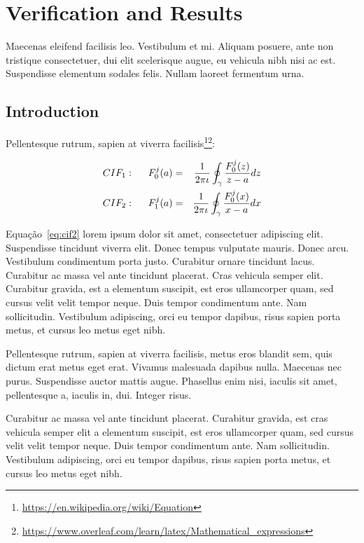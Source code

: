 \chapter{Verification and Results} \label{chap:ch3}

Maecenas eleifend facilisis leo. Vestibulum et
mi. Aliquam posuere, ante non tristique consectetuer, dui elit
scelerisque augue, eu vehicula nibh nisi ac est. 
Suspendisse elementum sodales felis. Nullam laoreet fermentum urna. 

\section{Introduction}

Pellentesque rutrum, sapien at viverra 
facilisis\footnote{\url{https://en.wikipedia.org/wiki/Equation}}\footnote{\url{https://www.overleaf.com/learn/latex/Mathematical_expressions}}:

\begin{eqnarray}
CIF_1: \hspace*{5mm}F_0^j(a) &=& \frac{1}{2\pi \iota} \oint_{\gamma} \frac{F_0^j(z)}{z - a} dz \label{eq:cif1} \\
CIF_2: \hspace*{5mm}F_1^j(a) &=& \frac{1}{2\pi \iota} \oint_{\gamma} \frac{F_0^j(x)}{x - a} dx \label{eq:cif2}
\end{eqnarray}

Equação~\ref{eq:cif2} lorem ipsum dolor sit amet, consectetuer
adipiscing elit. Suspendisse tincidunt viverra elit. Donec tempus
vulputate mauris. Donec arcu. Vestibulum condimentum porta
justo. Curabitur ornare tincidunt lacus. Curabitur ac massa vel ante
tincidunt placerat. Cras vehicula semper elit. Curabitur gravida, est
a elementum suscipit, est eros ullamcorper quam, sed cursus velit
velit tempor neque. Duis tempor condimentum ante. Nam
sollicitudin. Vestibulum adipiscing, orci eu tempor dapibus, risus
sapien porta metus, et cursus leo metus eget nibh. 

Pellentesque rutrum, sapien at viverra facilisis, metus eros blandit
sem, quis dictum erat metus eget erat. Vivamus malesuada dapibus
nulla. Maecenas nec purus. Suspendisse auctor mattis augue. Phasellus
enim nisi, iaculis sit amet, pellentesque a, iaculis in, dui. Integer
risus. 

Curabitur ac massa vel ante tincidunt placerat. 
Curabitur gravida, est cras vehicula semper elit
a elementum suscipit, est eros ullamcorper quam, sed cursus velit
velit tempor neque. Duis tempor condimentum ante. Nam
sollicitudin. Vestibulum adipiscing, orci eu tempor dapibus, risus
sapien porta metus, et cursus leo metus eget nibh.

